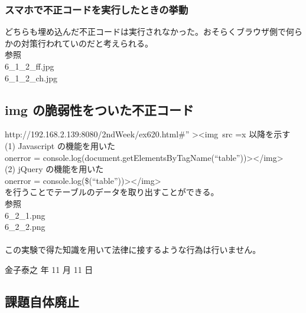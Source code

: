 \documentclass[a4j]{jarticle}
\begin{document}
      \subsubsection{スマホで不正コードを実行したときの挙動}
        どちらも埋め込んだ不正コードは実行されなかった。おそらくブラウザ側で何らかの対策行われていのだと考えられる。\\
        参照\\
        6\_1\_2\_ff.jpg\\
        6\_1\_2\_ch.jpg
    \subsection{img の脆弱性をついた不正コード}
      http://192.168.2.139:8080/2ndWeek/ex620.html\#” \textgreater \textless img\ src =x 以降を示す\\
      (1) Javascript の機能を用いた\\
      onerror = console.log(document.getElementsByTagName(“table”))\textgreater \textless/img\textgreater\\
      (2) jQuery の機能を用いた\\
      onerror = console.log(\$(“table”))\textgreater \textless/img\textgreater \\
      を行うことでテーブルのデータを取り出すことができる。\\
      参照\\
      6\_2\_1.png\\
      6\_2\_2.png\\
      \vspace{2em}\\
      この実験で得た知識を用いて法律に接するような行為は行いません。
      \begin{flushright}
        金子泰之 年 11 月 11 日
      \end{flushright}
    \subsection{課題自体廃止}
\end{document}
